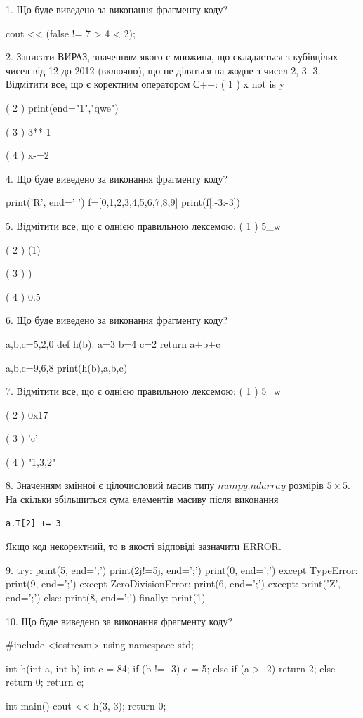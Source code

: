 \documentclass[11pt]{article}
\begin{document}
1. Що буде виведено за виконання фрагменту коду?

cout << (false != 7 > 4 < 2);

2. 
Записати ВИРАЗ, значенням якого є множина, що складається з кубівцілих чисел від 12 до 2012 (включно), що не діляться на жодне з чисел 2, 3.
3. %
Відмітити все, що є коректним оператором С++:
( 1 ) x not is y

( 2 ) print(end="1","qwe")

( 3 ) 3**-1

( 4 ) x-=2

4. Що буде виведено за виконання фрагменту коду?

print('R', end=' ')
f=[0,1,2,3,4,5,6,7,8,9]
print(f[:-3:-3])


5. %
Відмітити все, що є однією правильною лексемою:
( 1 ) 5_w

( 2 ) (1)

( 3 ) )

( 4 ) 0.5

6. Що буде виведено за виконання фрагменту коду?

a,b,c=5,2,0
def h(b):
    a=3
    b=4
    c=2
    return a+b+c

a,b,c=9,6,8
print(h(b),a,b,c)

7. %
Відмітити все, що є однією правильною лексемою:
( 1 ) 5_w

( 2 ) 0x17

( 3 ) 'c'

( 4 ) "1,3,2"

8. 
Значенням змінної  є цілочисловий масив типу $numpy.ndarray$ розмірів $5{\times}5$. На скільки збільшиться сума елементів масиву  після виконання
\begin{verbatim}
a.T[2] += 3
\end{verbatim}


Якщо код некоректний, то в якості відповіді зазначити ERROR.



9. 
try:
    print(5, end=';')
    print(2j!=5j, end=';')
    print(0, end=';')
except TypeError:
    print(9, end=';')
except ZeroDivisionError:
    print(6, end=';')
except:
    print('Z', end=';')
else:
    print(8, end=';')
finally:
    print(1)

10. Що буде виведено за виконання фрагменту коду?

#include <iostream>
using namespace std;

int h(int a, int b){
    int c = 84;
    if (b != -3)
        c = 5;
    else if (a > -2)
         return 2;
    else 
        return 0;
    return c;
}

int main(){
    cout << h(3, 3);
    return 0;
}











\newpage
\end{document}
